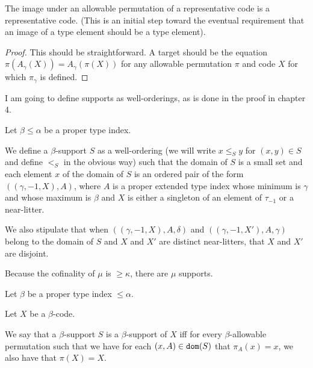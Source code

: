 \begin{lemma}
\label {lem:rep-preserved}
The image under an allowable permutation of a representative code is a representative code.  (This is an initial step toward the eventual requirement that an image of a type element should be a type element).
\end{lemma}

\begin{proof}
This should be straightforward.  A target should be the equation $\pi(A_\gamma(X)) = A_\gamma(\pi(X))$ for any allowable permutation $\pi$ and code $X$ for which $\pi_\gamma$ is defined.
\end{proof}

I am going to define supports as well-orderings, as is done in the proof in chapter 4.

\begin{definition}
\label {def:support}
Let $\beta \leq \alpha$ be a proper type index.

We define a $\beta$-support $S$ as a well-ordering (we will write $x \leq_S y$ for $(x,y) \in S$ and define $<_S$ in the obvious way) such that the domain of $S$ is a small set and each element $x$ of the domain of $S$ is an ordered pair of the form
$((\gamma,-1,X),A)$, where $A$ is a proper extended type index whose minimum is $\gamma$ and whose maximum is $\beta$
and $X$ is either a singleton of an element of $\tau_{-1}$ or a near-litter.

We also stipulate that when $((\gamma,-1,X),A,\delta)$ and $((\gamma,-1,X'),A,\gamma)$ belong to the domain of $S$
and $X$ and $X'$ are distinct near-litters, that $X$ and $X'$ are disjoint.
\end{definition}

\begin{lemma}
\label {lem:count-supports}
Because the cofinality of $\mu$ is $\geq \kappa$, there are $\mu$ supports.
\end{lemma}

\begin{definition}
\label {def:support-of}
Let $\beta$ be a proper type index $\leq \alpha$.

Let $X$ be a $\beta$-code.

We say that a $\beta$-support $S$ is a $\beta$-support of $X$ iff for every $\beta$-allowable permutation such that
we have for each $(x,A) \in {\tt dom}(S)$ that $\pi_A(x)=x$, we also have that $\pi(X)=X$.
\end{definition}

